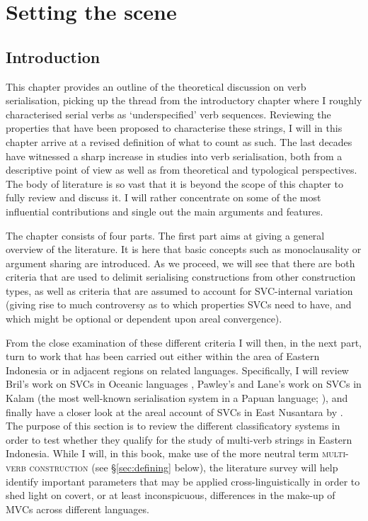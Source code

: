 \chapter{Setting the scene}\label{ch:theory}
\section{Introduction}
This chapter provides an outline of the theoretical discussion on verb serialisation, picking up the thread from the introductory chapter where I roughly characterised serial verbs as `underspecified' verb sequences. Reviewing the properties that have been proposed to characterise these strings, I will in this chapter arrive at a revised definition of what to count as such. The last decades have witnessed a sharp increase in studies into verb serialisation, both from a descriptive point of view as well as from theoretical and typological perspectives. The body of literature is so vast that it is beyond the scope of this chapter to fully review and discuss it. I will rather concentrate on some of the most influential contributions and single out the main arguments and features.

The chapter consists of four parts. The first part aims at giving a general overview of the literature. It is here that basic concepts such as monoclausality or argument sharing are introduced. As we proceed, we will see that there are both criteria that are used to delimit serialising constructions from other construction types, as well as criteria that are assumed to account for SVC-internal variation (giving rise to much controversy as to which properties SVCs need to have, and which might be optional or dependent upon areal convergence). 

From the close examination of these different criteria I will then, in the next part, turn to work that has been carried out either within the area of Eastern Indonesia or in adjacent regions on related languages. Specifically, I will review Bril's work on SVCs in Oceanic languages \citep{bril2004complex,bril2007nexus}, Pawley's and Lane's work on SVCs in Kalam (the most well-known serialisation system in a Papuan language; \citealt{Pawley1987, pawley2011event, lane2008kalam}), and finally have a closer look at the areal account of SVCs in East Nusantara by \citet{vanstaden2008serial}. The purpose of this section is to review the different classificatory systems in order to test whether they qualify for the study of multi-verb strings in Eastern Indonesia. While I will, in this book, make use of the more neutral term \textsc{multi-verb construction} (see §\ref{sec:defining} below), the literature survey will help identify important parameters that may be applied cross-linguistically in order to shed light on covert, or at least inconspicuous, differences in the make-up of MVCs across different languages.


